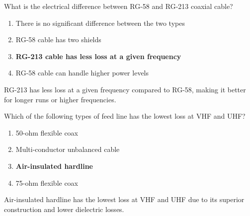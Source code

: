 \begin{tcolorbox}[colback=gray!10!white,colframe=black!75!black,title={T9B10}]
What is the electrical difference between RG-58 and RG-213 coaxial cable?
\begin{enumerate}[label=\Alph*),noitemsep]
    \item There is no significant difference between the two types
    \item RG-58 cable has two shields
    \item \textbf{RG-213 cable has less loss at a given frequency}
    \item RG-58 cable can handle higher power levels
\end{enumerate}
\end{tcolorbox}
RG-213 has less loss at a given frequency compared to RG-58, making it better for longer runs or higher frequencies.

\begin{tcolorbox}[colback=gray!10!white,colframe=black!75!black,title={T9B11}]
Which of the following types of feed line has the lowest loss at VHF and UHF?
\begin{enumerate}[label=\Alph*),noitemsep]
    \item 50-ohm flexible coax
    \item Multi-conductor unbalanced cable
    \item \textbf{Air-insulated hardline}
    \item 75-ohm flexible coax
\end{enumerate}
\end{tcolorbox}
Air-insulated hardline has the lowest loss at VHF and UHF due to its superior construction and lower dielectric losses.
